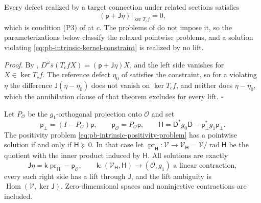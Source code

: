Every defect realized by a target connection under related sections satisfies
\begin{equation}
(\mathsf p+\mathsf J\eta)|_{\ker T_cf}=0,
\label{eq:pb-intrinsic-kernel-constraint}
\end{equation}
which is condition (P3) of  at \(c\). The problems of
 do not impose it, so the parameterizations below classify the
relaxed pointwise problems, and a solution violating \eqref{eq:pb-intrinsic-kernel-constraint} is
realized by no lift. 

\noindent\emph{Proof.}
By , \(D^{\bar\omega}\bar s(T_cfX)=(\mathsf p+\mathsf J\eta)X\),
and the left side vanishes for \(X\in\ker T_cf\). The reference defect \(\eta_0\) of
 satisfies the constraint, so for a violating \(\eta\) the
difference \(\mathsf J(\eta-\eta_0)\) does not vanish on \(\ker T_cf\), and neither does
\(\eta-\eta_0\), which the annihilation clause of that theorem excludes for every lift.
\hfill$\square$

Let \(P_{\mathcal O}\) be the \(g_1\)-orthogonal projection onto \(\mathcal O\) and set
\begin{equation}
\mathsf p_\perp=(I-P_{\mathcal O})\mathsf p,\qquad \mathsf p_{\mathcal O}=P_{\mathcal O}\mathsf p,\qquad
\mathsf H=\mathsf D^*g_0\mathsf D-\mathsf p_\perp^*g_1\mathsf p_\perp.
\label{eq:pb-defect-positivity-budget}
\end{equation}
The positivity problem \eqref{eq:pb-intrinsic-positivity-problem} has a pointwise solution if and only
if \(\mathsf H\succeq0\). In that case let
\(\operatorname{pr}_{\mathsf H}:\mathcal V\to\mathcal V_{\mathsf H}=\mathcal V/\operatorname{rad}\mathsf H\)
be the quotient with the inner product induced by \(\mathsf H\). All solutions are exactly
\begin{equation}
\mathsf J\eta=\mathsf k\operatorname{pr}_{\mathsf H}-\mathsf p_{\mathcal O},\qquad
\mathsf k:(\mathcal V_{\mathsf H},\mathsf H)\longrightarrow(\mathcal O,g_1)
\text{ a linear contraction},
\label{eq:pb-defect-contraction-parameterization}
\end{equation}
every such right side has a lift through \(\mathsf J\), and the lift ambiguity is
\(\operatorname{Hom}(\mathcal V,\ker\mathsf J)\). Zero-dimensional spaces and noninjective contractions
are included. 

